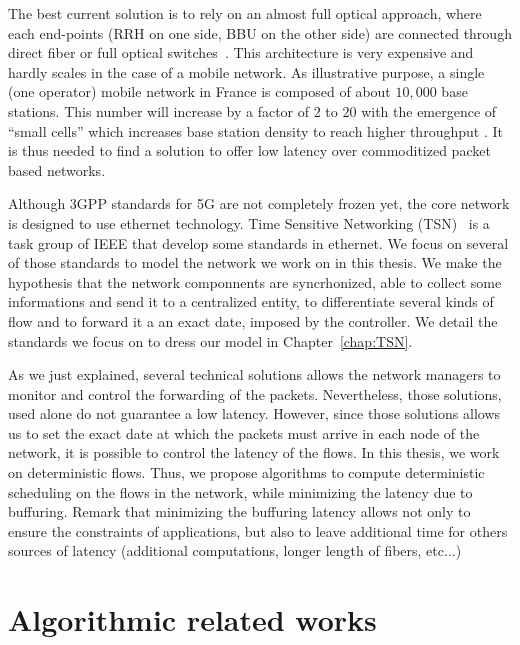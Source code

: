The best current solution is to rely on an almost full optical approach, where each end-points (RRH on one side, BBU on the other side) are connected through direct fiber or full optical switches~\cite{pizzinat2015things,tayq2017real}. This architecture is very expensive and hardly scales in the case of a mobile network. As illustrative purpose, a single (one operator) mobile network in France is composed of about $10,000$ base stations. This number will increase by a factor of $2$ to $20$ with the emergence of “small cells” which increases base station density to reach higher throughput \cite{leclerc2016transmission,leclerc2016signaling}. It is thus needed to find a solution to offer low latency over commoditized packet based networks. 

Although 3GPP standards for 5G are not completely frozen yet, the core network is designed to use ethernet technology. Time Sensitive Networking (TSN)~\cite{ieee802,ieeep802} is a task group of IEEE that develop some standards in ethernet. We focus on several of those standards to model the network we work on in this thesis. We make the hypothesis that the network componnents are syncrhonized, able to collect some informations and send it to a centralized entity, to differentiate several kinds of flow and to forward it a an exact date, imposed by the controller. We detail the standards we focus on to dress our model in Chapter~\ref{chap:TSN}.

As we just explained, several technical solutions allows the network managers to monitor and control the forwarding of the packets. Nevertheless, those solutions, used alone do not guarantee a low latency. However, since those solutions allows us to set the exact date at which the packets must arrive in each node of the network, it is possible to control the latency of the flows. In this thesis, we work on deterministic flows. Thus, we propose algorithms to compute deterministic scheduling on the flows in the network, while minimizing the latency due to buffuring. Remark that minimizing the buffuring latency allows not only to ensure the constraints of applications, but also to leave additional time for others sources of latency (additional computations, longer length of fibers, etc...)



\section{Algorithmic related works}
 
